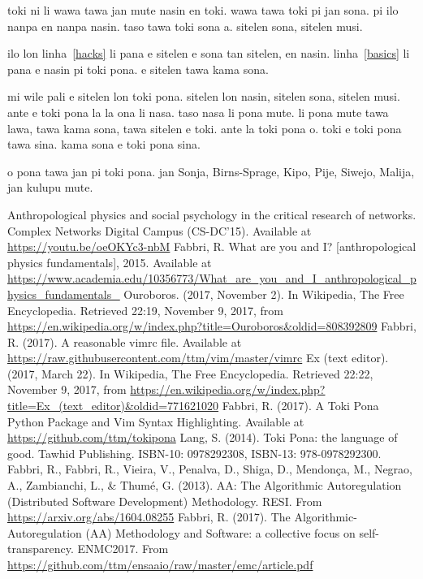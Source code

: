 \documentclass{article}
\begin{document}
toki ni li wawa tawa jan mute nasin en toki.
wawa tawa toki pi jan sona.
pi ilo nanpa en nanpa nasin.
taso tawa toki sona a.
sitelen sona, sitelen musi.

ilo lon linha~\ref{hacks} li pana e sitelen
e sona tan sitelen,
en nasin.
linha~\ref{basics} li pana e nasin pi toki pona.
e sitelen tawa kama sona.

mi wile pali e sitelen lon toki pona.
sitelen lon nasin, sitelen sona,
sitelen musi.
ante e toki pona la
la ona li nasa.
taso nasa li pona mute.
li pona mute tawa lawa,
tawa kama sona, tawa sitelen e toki.
ante la toki pona o.
toki e toki pona tawa sina.
kama sona e toki pona sina.

o pona tawa jan pi toki pona.
jan Sonja, Birns-Sprage, Kipo, Pije,
Siwejo, Malija, jan kulupu mute.

\begin{thebibliography}{99}
\fontsize{11}{0}\selectfont
{}
	Anthropological physics and social psychology in the critical research of networks. Complex Networks Digital Campus (CS-DC'15).
	Available at \url{https://youtu.be/oeOKYc3-nbM}
	Fabbri, R. What are you and I? [anthropological physics fundamentals], 2015. Available at \url{https://www.academia.edu/10356773/What_are_you_and_I_anthropological_physics_fundamentals_}
  Ouroboros. (2017, November 2). In Wikipedia, The Free Encyclopedia. Retrieved 22:19, November 9, 2017, from \url{https://en.wikipedia.org/w/index.php?title=Ouroboros&oldid=808392809}
	Fabbri, R. (2017). A reasonable vimrc file. Available at \url{https://raw.githubusercontent.com/ttm/vim/master/vimrc} 
  Ex (text editor). (2017, March 22). In Wikipedia, The Free Encyclopedia. Retrieved 22:22, November 9, 2017, from \url{https://en.wikipedia.org/w/index.php?title=Ex_(text_editor)&oldid=771621020}
	Fabbri, R. (2017). A Toki Pona Python Package and Vim Syntax Highlighting. Available at \url{https://github.com/ttm/tokipona} 
	Lang, S. (2014). Toki Pona: the language of good. Tawhid Publishing.
    ISBN-10: 0978292308, ISBN-13: 978-0978292300.
	Fabbri, R., Fabbri, R., Vieira, V., Penalva, D., Shiga, D., Mendonça, M., Negrao, A., Zambianchi, L., \& Thumé, G. (2013). AA: The Algorithmic Autoregulation (Distributed Software Development) Methodology. RESI. From \url{https://arxiv.org/abs/1604.08255}
	Fabbri, R. (2017).
The Algorithmic-Autoregulation (AA) Methodology and Software:
a collective focus on self-transparency. ENMC2017. From \url{https://github.com/ttm/ensaaio/raw/master/emc/article.pdf} 

\end{thebibliography}
\end{document}
